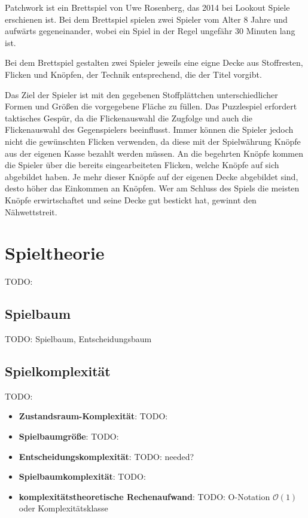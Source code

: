 Patchwork ist ein Brettspiel von Uwe Rosenberg, das 2014 bei Lookout Spiele erschienen ist. Bei dem Brettspiel spielen zwei Spieler vom Alter 8 Jahre und aufwärts gegeneinander, wobei ein Spiel in der Regel ungefähr 30 Minuten lang ist. \cite{LookoutSpielePatchwork}

Bei dem Brettspiel gestalten zwei Spieler jeweils eine eigne Decke aus Stoffresten, Flicken und Knöpfen, der Technik entsprechend, die der Titel vorgibt. \cite{SpielDesJahresPatchwork}

Das Ziel der Spieler ist mit den gegebenen Stoffplättchen unterschiedlicher Formen und Größen die vorgegebene Fläche zu füllen. Das Puzzlespiel erfordert taktisches Gespür, da die Flickenauswahl die Zugfolge und auch die Flickenauswahl des Gegenspielers beeinflusst. Immer können die Spieler jedoch nicht die gewünschten Flicken verwenden, da diese mit der Spielwährung Knöpfe aus der eigenen Kasse bezahlt werden müssen. An die begehrten Knöpfe kommen die Spieler über die bereits eingearbeiteten Flicken, welche Knöpfe auf sich abgebildet haben. Je mehr dieser Knöpfe auf der eigenen Decke abgebildet sind, desto höher das Einkommen an Knöpfen. Wer am Schluss des Spiels die meisten Knöpfe erwirtschaftet und seine Decke gut bestickt hat, gewinnt den Nähwettstreit. \cite{SpielDesJahresPatchwork}

\section{Spieltheorie}
\label{chapter:spieltheorie}

TODO:

\subsection{Spielbaum}

TODO: Spielbaum, Entscheidungsbaum

\subsection{Spielkomplexität}

TODO:

\begin{itemize}
    \item \textbf{Zustandsraum-Komplexität}: TODO:
    \item \textbf{Spielbaumgröße}: TODO:
    \item \textbf{Entscheidungskomplexität}: TODO: needed?
    \item \textbf{Spielbaumkomplexität}: TODO:
    \item \textbf{komplexitätstheoretische Rechenaufwand}: TODO: O-Notation $\mathcal{O}(1)$ oder Komplexitätsklasse
\end{itemize}


